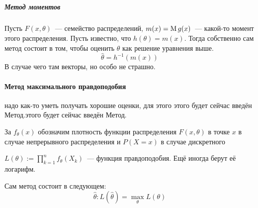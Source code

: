 \documentclass[12pt,timbord]{../../../notes}
\begin{document}
\subparagraph{ \flame}
\subparagraph{Метод моментов}

\begin{defn}\label{defn:stat:mom:method}

  Пусть $F(x,\theta)$~--- семейство распределений, $m(x) = \operatorname{\mathrm M} g(x)$~--- какой-то момент этого
  распределения. Пусть известно, что $h(\theta) = m(x)$. Тогда собственно сам метод состоит в том,
  чтобы оценить $\theta$ как решение уравнения выше.
  \[
    \hat \theta = h^{-1} (m(x))
  \]
  В случае чего там векторы, но особо не страшно.

\end{defn}

\begin{exmp}\label{exmp:stat::mom::norm}
\end{exmp}

\paragraph{Метод максимального правдоподобия}
\label{par:stat::maklike}
надо как-то уметь получать хорошие  оценки, для этого этого будет сейчас введён Метод.этого будет
сейчас введён Метод.

\begin{defn}\label{defn:stat::maxlike::dens}
  За $f_\theta (x) $ обозначим плотность функции распределения $F(x,\theta)$ в точке $x$ в случае
  непрерывного распределения и $P(X=x)$ в случае дискретного
\end{defn}
\begin{defn}\label{defn:stat::maxlike::fun}
  $\displaystyle L(\theta):= \prod_{k=1}^n f_\theta(X_k)$~--- функция правдоподобия.
  Ещё иногда берут её логарифм.
\end{defn}

\begin{defn}\label{defn:stat::maxlike::method}
  Сам метод состоит в следующем:
  \[
    \hat \theta \colon L(\hat \theta) = \max_\theta L (\theta)
  \]
\end{defn}

\end{document}
